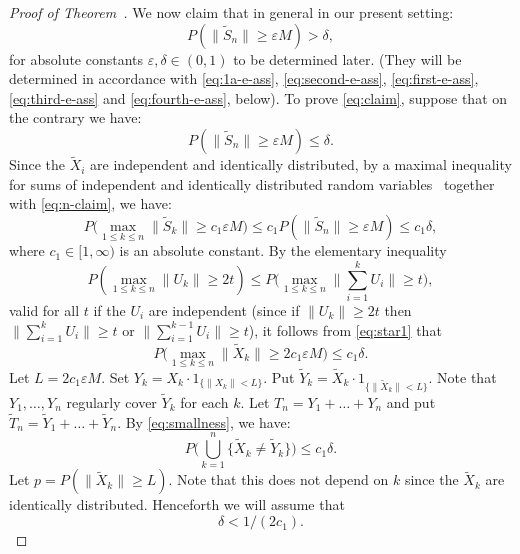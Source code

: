 \documentclass[12pt]{amsart}
\def\Ind#1{1_{\{#1\}}}
\def\e{\varepsilon}
\def\oo{\infty}
\def\upref#1{\upn{\ref{#1}}}
\theoremstyle{definition}
\theoremstyle{plain}
\theoremstyle{remark}
\begin{document}
\begin{proof}[Proof of Theorem~\upref{th:main}]
We now claim that in general in our present setting:
\begin{equation}\label{eq:claim}
        P(\|\tilde S_n\|\ge \e M) > \delta,
\end{equation}
for absolute constants $\e,\delta\in (0,1)$ to be determined later.
(They will be determined in accordance with
\eqref{eq:1a-e-ass},
\eqref{eq:second-e-ass},
\eqref{eq:first-e-ass},
\eqref{eq:third-e-ass} and
\eqref{eq:fourth-e-ass}, below).  To prove \eqref{eq:claim}, suppose
that on the contrary we have:
\begin{equation}\label{eq:n-claim}
        P(\|\tilde S_n\|\ge \e M) \le \delta.
\end{equation}
Since the $\tilde X_i$ are independent and identically distributed,
by a maximal inequality for sums of independent and identically
distributed random variables~\cite[Corollary~4]{MS} together with
\eqref{eq:n-claim}, we have:
\begin{equation}\label{eq:star1}
        P\bigl(\max_{1\le k\le n} \|\tilde S_k\|\ge c_1\e M\bigr)
         \le c_1P(\|\tilde S_n\|\ge \e M)\le c_1\delta,
\end{equation}
where $c_1\in [1,\oo)$ is an absolute constant.  By the elementary
inequality
$$
        P(\max_{1\le k\le n} \|U_k\|\ge 2t)\le
        P\biggl(\max_{1\le k\le n} \biggl\| \sum_{i=1}^k U_i \biggr\| \ge
        t\biggr),
$$
valid for all $t$ if the $U_i$ are independent (since
if $\|U_k\|\ge 2t$ then $\| \sum_{i=1}^k U_i \|\ge t$ or $\|\sum_{i=1}^{k-1}
U_i\|\ge t$), it follows from \eqref{eq:star1} that
\begin{equation}\label{eq:smallness}
        P\bigl(\max_{1\le k\le n} \|\tilde X_k\|\ge 2c_1\e M\bigr)
         \le c_1\delta.
\end{equation}
Let $L=2c_1\e M$.
Set $Y_k=X_k\cdot \Ind{ \|X_k\|<L }$.  Put $\tilde Y_k=\tilde
X_k\cdot\Ind{\|\tilde X_k\|< L }$.  Note that $Y_1,\dots,Y_n$ regularly
cover $\tilde Y_k$ for each $k$.  Let $T_n=Y_1+\dots+Y_n$ and put
$\tilde T_n=\tilde Y_1+\dots+\tilde Y_n$.  By \eqref{eq:smallness}, we
have:
\begin{equation}\label{eq:tilde-close}
        P\biggl(\bigcup_{k=1}^n \{ \tilde X_k\ne\tilde Y_k \}\biggr)
         \le c_1\delta.
\end{equation}
Let $p=P(\|\tilde X_k\|\ge L)$.  Note that this does not depend on
$k$ since the $\tilde X_k$ are identically distributed.
Henceforth we will assume that
\begin{equation}\label{eq:1a-e-ass}
        \delta<1/(2c_1).
\end{equation}

\end{proof}
\end{document}
